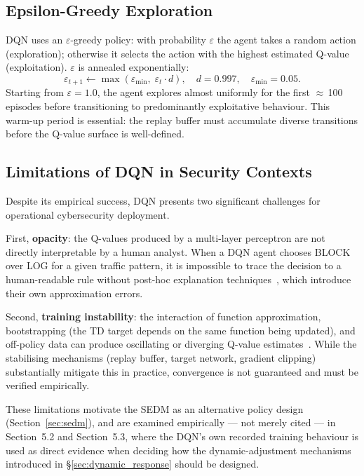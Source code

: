 \subsection{Epsilon-Greedy Exploration}

DQN uses an $\varepsilon$-greedy policy: with probability $\varepsilon$
the agent takes a random action (exploration); otherwise it selects the
action with the highest estimated Q-value (exploitation).
$\varepsilon$ is annealed exponentially:
%
\begin{equation}
  \varepsilon_{t+1} \leftarrow \max\!\left(\varepsilon_{\min},\;
                                            \varepsilon_t \cdot d\right),
  \quad d = 0.997,\quad \varepsilon_{\min} = 0.05.
\end{equation}
%
Starting from $\varepsilon = 1.0$, the agent explores almost uniformly for
the first $\approx$\,100 episodes before transitioning to predominantly
exploitative behaviour.
This warm-up period is essential: the replay buffer must accumulate diverse
transitions before the Q-value surface is well-defined.

\subsection{Limitations of DQN in Security Contexts}

Despite its empirical success, DQN presents two significant challenges for
operational cybersecurity deployment.

First, \textbf{opacity}: the Q-values produced by a multi-layer perceptron
are not directly interpretable by a human analyst.
When a DQN agent chooses BLOCK over LOG for a given traffic pattern, it is
impossible to trace the decision to a human-readable rule without
post-hoc explanation techniques~\citep{lundberg2017unified}, which introduce
their own approximation errors.

Second, \textbf{training instability}: the interaction of function
approximation, bootstrapping (the TD target depends on the same function
being updated), and off-policy data can produce oscillating or diverging
Q-value estimates~\citep{van2016deep}.
While the stabilising mechanisms (replay buffer, target network, gradient
clipping) substantially mitigate this in practice, convergence is not
guaranteed and must be verified empirically.

These limitations motivate the SEDM as an alternative policy design
(Section~\ref{sec:sedm}), and are examined empirically --- not merely cited
--- in Section~5.2 and Section~5.3, where the DQN's own recorded training
behaviour is used as direct evidence when deciding how the dynamic-adjustment
mechanisms introduced in \S\ref{sec:dynamic_response} should be designed.

